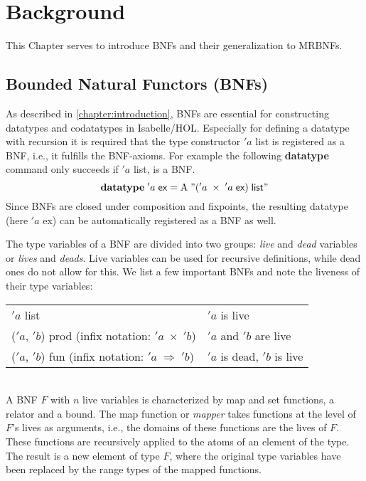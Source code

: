 
\chapter{Background}
\label{chapter:background}

  This Chapter serves to introduce \acp{BNF} and their generalization to \acp{MRBNF}. 
  \section{Bounded Natural Functors (BNFs)}
    As described in \autoref{chapter:introduction}, \acp{BNF} are essential for constructing datatypes and codatatypes in Isabelle/HOL. Especially for defining a datatype with recursion it is required that the type constructor \textsf{$'a$ list} is registered as a \ac{BNF}, i.e., it fulfills the \ac{BNF}-axioms. For example the following \textbf{datatype} command only succeeds if \textsf{$'a$ list}, is a \ac{BNF}.
    \begin{equation*}
      \textbf{datatype}\; 'a\; \textsf{ex} = \text{A}\; "('a\; \times\; 'a\; \textsf{ex})\; \textsf{list}"
    \end{equation*}
    Since \acp{BNF} are closed under composition and fixpoints, the resulting datatype (here \textsf{$'a$ ex}) can be automatically registered as a \ac{BNF} as well.


    The type variables of a \ac{BNF} are divided into two groups: \textit{live} and \textit{dead} variables or \textit{lives} and \textit{deads}. Live variables can be used for recursive definitions, while dead ones do not allow for this. 
    We list a few important \acp{BNF} and note the liveness of their type variables:\\

    \begin{tabular}{l|l}
      \textsf{$'a$ list} & $'a$ is live\\
      \textsf{($'a$, $'b$) prod} (infix notation: \textsf{$'a\; \times\; 'b$}) & $'a$ and $'b$ are live\\
      \textsf{($'a$, $'b$) fun} (infix notation: \textsf{$'a\; \Rightarrow\; 'b$}) & $'a$ is dead, $'b$ is live\\
    \end{tabular}\\

    A \ac{BNF} $F$ with $n$ live variables is characterized by map and set functions, a relator and a bound. The map function or \textit{mapper} takes functions at the level of $F$'s lives as arguments, i.e., the domains of these functions are the lives of $F$. These functions are recursively applied to the atoms of an element of the type. The result is a new element of type $F$, where the original type variables have been replaced by the range types of the mapped functions.

